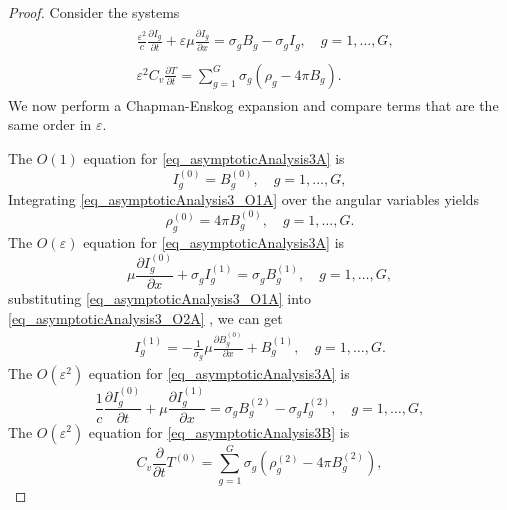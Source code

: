 \documentclass[10pt,a4paper]{amsart}
\newcommand{\pdrv}[2]{\frac{\partial{#1}}{\partial{#2}}}
\begin{document}
\begin{proof}
Consider the systems
    \begin{subequations}
		\begin{align}\label{eq_asymptoticAnalysis3A}
            &\begin{aligned}
                \frac{\varepsilon^2}{c} \frac{\partial I_g}{\partial t}+\varepsilon\mu \pdrv{I_g}{x}  = \sigma_{g} B_g-\sigma_{g}I_g,  \quad g=1,\ldots,G, 
            \end{aligned}
            \\
		  &\begin{aligned}\label{eq_asymptoticAnalysis3B}
                \varepsilon^2 C_v \frac{\partial T}{\partial t}=\sum_{g=1}^{G} \sigma_{g} \left( \rho_g- 4 \pi B_g  \right) . 
            \end{aligned}
		\end{align}
   \end{subequations} 
  We now perform a Chapman-Enskog expansion and compare terms that are the same order in $\varepsilon$.
   
   

   The $O(1)$ equation for \eqref{eq_asymptoticAnalysis3A} is
    \begin{equation}\label{eq_asymptoticAnalysis3_O1A}
        I_g^{(0)} = B_g^{(0)},  \quad g=1,\ldots,G, 
    \end{equation}
    Integrating \eqref{eq_asymptoticAnalysis3_O1A} over the angular variables yields 
      \begin{equation}\label{eq_asymptoticAnalysis3_O1B}
        \rho_g^{(0)} =  4 \pi B_g^{(0)},  \quad g=1,\ldots,G. 
    \end{equation}
    The $O(\varepsilon)$ equation for \eqref{eq_asymptoticAnalysis3A} is
    \begin{equation}\label{eq_asymptoticAnalysis3_O2A}
        \mu \pdrv{I_g^{(0)}}{x}  + \sigma_{g}I_g^{(1)} = \sigma_{g} B_g^{(1)} ,  \quad g=1,\ldots,G, 
    \end{equation}
    substituting \eqref{eq_asymptoticAnalysis3_O1A} into \eqref{eq_asymptoticAnalysis3_O2A} , we can get
    \begin{equation} \label{eq_asymptoticAnalysis3_O2B}
        \begin{aligned}
                I_g^{(1)} = - \frac{1}{ \sigma_g} \mu \pdrv{B_g^{(0)}}{x}+  B_g^{(1)} ,  \quad g=1,\ldots,G. 
        \end{aligned}
    \end{equation}
    The $O(\varepsilon^2)$ equation for \eqref{eq_asymptoticAnalysis3A} is
    \begin{equation}\label{eq_asymptoticAnalysis3_O3A}
        \frac{1}{c} \frac{\partial I_g^{(0)}}{\partial t}+\mu \pdrv{I_g^{(1)}}{x}  = \sigma_{g} B_g^{(2)}-\sigma_{g}I_g^{(2)},  \quad g=1,\ldots,G, 
    \end{equation}
       The $O(\varepsilon^2)$ equation for \eqref{eq_asymptoticAnalysis3B} is
        \begin{equation}\label{eq_asymptoticAnalysis3_O3B}
        C_v \frac{\partial }{\partial t} T^{(0)} =\sum_{g=1}^{G} \sigma_{g} \left( \rho_g^{(2)}- 4 \pi B_g^{(2)}  \right), 
    \end{equation}


\end{proof}
\end{document}
